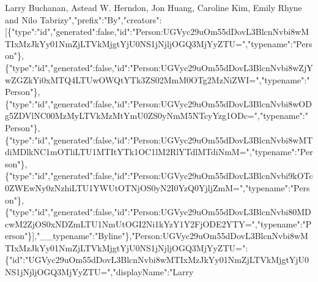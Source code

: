 Larry Buchanan, Astead W. Herndon, Jon Huang, Caroline Kim, Emily Rhyne
and Nilo
Tabrizy","prefix":"By","creators":{[}\{"type":"id","generated":false,"id":"Person:UGVyc29uOm55dDovL3BlcnNvbi8wMTIxMzJkYy01NmZjLTVkMjgtYjU0NS1jNjljOGQ3MjYyZTU=","typename":"Person"\},\{"type":"id","generated":false,"id":"Person:UGVyc29uOm55dDovL3BlcnNvbi8wZjYwZGZkYi0xMTQ4LTUwOWQtYTk3ZS02MmM0OTg2MzNiZWI=","typename":"Person"\},\{"type":"id","generated":false,"id":"Person:UGVyc29uOm55dDovL3BlcnNvbi8wODg5ZDVlNC00MzMyLTVkMzMtYmU0ZS0yNmM5NTcyYzg1ODc=","typename":"Person"\},\{"type":"id","generated":false,"id":"Person:UGVyc29uOm55dDovL3BlcnNvbi8wMTdiMDlkNC1mOTliLTU1MTItYTk1OC1lM2RlYTdlMTdiNmM=","typename":"Person"\},\{"type":"id","generated":false,"id":"Person:UGVyc29uOm55dDovL3BlcnNvbi9kOTc0ZWEwNy0zNzhiLTU1YWUtOTNjOS0yN2I0YzQ0YjljZmM=","typename":"Person"\},\{"type":"id","generated":false,"id":"Person:UGVyc29uOm55dDovL3BlcnNvbi80MDcwM2ZjOS0xNDZmLTU1NmUtOGI2Ni1kYzY1Y2FjODE2YTY=","typename":"Person"\}{]},"\_\_typename":"Byline"\},"Person:UGVyc29uOm55dDovL3BlcnNvbi8wMTIxMzJkYy01NmZjLTVkMjgtYjU0NS1jNjljOGQ3MjYyZTU=":\{"id":"UGVyc29uOm55dDovL3BlcnNvbi8wMTIxMzJkYy01NmZjLTVkMjgtYjU0NS1jNjljOGQ3MjYyZTU=","displayName":"Larry
